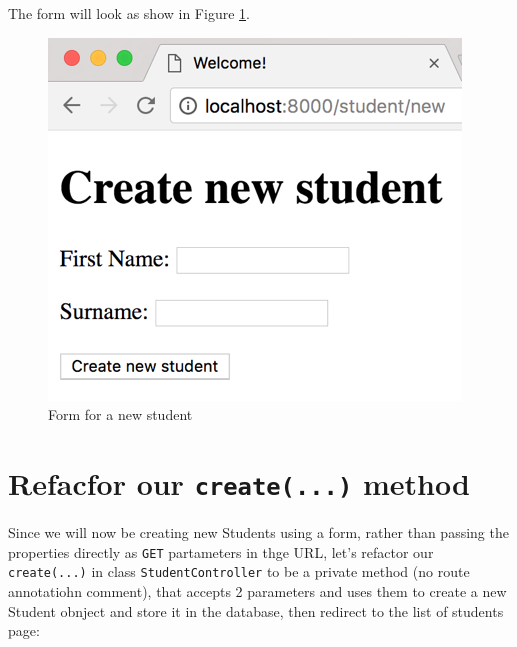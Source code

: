 \documentclass[a4paperpaper,openright]{book}
\begin{document}
The form will look as show in Figure \ref{new_student_form}.

\begin{figure}
\centering
\includegraphics{./tex2pdf.-65f13e14688ab55b/47fb9483958661b9823335391996ce0741d76a07.png}
\caption{Form for a new student \label{new_student_form}}
\end{figure}

\hypertarget{refacfor-our-create...-method}{%
\section{\texorpdfstring{Refacfor our \texttt{create(...)}
method}{Refacfor our create(...) method}}\label{refacfor-our-create...-method}}

Since we will now be creating new Students using a form, rather than
passing the properties directly as \texttt{GET} partameters in thge URL,
let's refactor our \texttt{create(...)} in class
\texttt{StudentController} to be a private method (no route annotatiohn
comment), that accepts 2 parameters and uses them to create a new
Student obnject and store it in the database, then redirect to the list
of students page:
\end{document}
